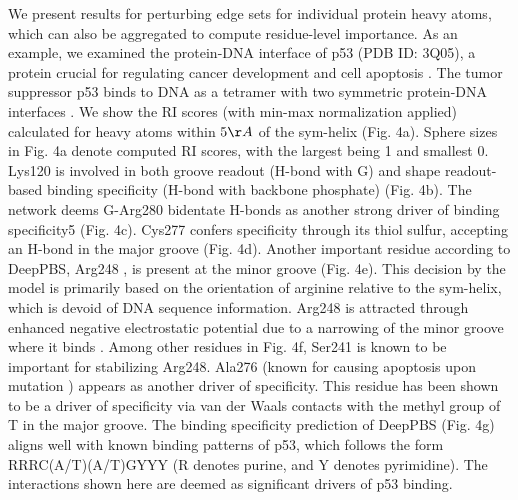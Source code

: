 \par
We present results for perturbing edge sets for individual protein heavy atoms, which can also be aggregated to compute residue-level importance. As an example, we examined the protein-DNA interface of p53 (PDB ID: 3Q05), a protein crucial for regulating cancer development and cell apoptosis \citep{Joerger2008}. The tumor suppressor p53 binds to DNA as a tetramer with two symmetric protein-DNA interfaces \citep{Kitayner2010, Petty2011}. We show the RI scores (with min-max normalization applied) calculated for heavy atoms within $5\AA$ of the sym-helix (Fig. 4a). Sphere sizes in Fig. 4a denote computed RI scores, with the largest being 1 and smallest 0. Lys120 \citep{Kitayner2006} is involved in both groove readout (H-bond with G) and shape readout-based binding specificity (H-bond with backbone phosphate) (Fig. 4b). The network deems G-Arg280 \citep{Kitayner2006} bidentate H-bonds as another strong driver of binding specificity5 (Fig. 4c). Cys277 confers specificity through its thiol sulfur, accepting an H-bond in the major groove \citep{Kitayner2006} (Fig. 4d). Another important residue according to DeepPBS, Arg248 \citep{Barakat2011}, is present at the minor groove (Fig. 4e). This decision by the model is primarily based on the orientation of arginine relative to the sym-helix, which is devoid of DNA sequence information. Arg248 is attracted through enhanced negative electrostatic potential due to a narrowing of the minor groove where it binds \citep{Kitayner2010}. Among other residues in Fig. 4f, Ser241 is known \citep{Barakat2011} to be important for stabilizing Arg248. Ala276 (known for causing apoptosis upon mutation \citep{Reaz2013}) appears as another driver of specificity. This residue has been shown to be a driver of specificity via van der Waals contacts with the methyl group of T in the major groove\citep{Kitayner2006}. The binding specificity prediction of DeepPBS (Fig. 4g) aligns well with known binding patterns of p53, which follows the form RRRC(A/T)(A/T)GYYY (R denotes purine, and Y denotes pyrimidine). The interactions shown here are deemed \citep{Joerger2008, Vousden2009} as significant drivers of p53 binding.

